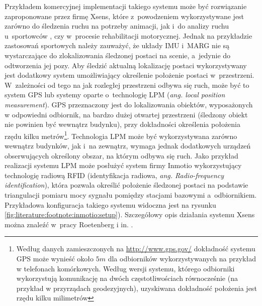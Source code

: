 Przykładem komercyjnej implementacji takiego systemu może być rozwiązanie zaproponowane przez firmę Xsens, które z~powodzeniem wykorzystywane jest zarówno do śledzenia ruchu na potrzeby animacji{}, jak i~do analizy ruchu u~sportowców {}, czy w~procesie rehabilitacji motorycznej{}. Jednak na przykładzie zastosowań sportowych należy zauważyć, że układy IMU i~MARG nie są wystarczające do zlokalizowania śledzonej postaci na scenie, a~jedynie do odtworzenia jej pozy. Aby śledzić aktualną lokalizację postaci wykorzystywany jest dodatkowy system umożliwiający określenie położenie postaci w~przestrzeni. W~zależności od tego na jak rozległej przestrzeni odbywa się ruch, może być to system GPS lub systemy oparte o~technologię LPM (\emph{ang. local position measurement}). GPS przeznaczony jest do lokalizowania obiektów, wyposażonych w odpowiedni odbiornik, na bardzo dużej otwartej przestrzeni (śledzony obiekt nie powinien być wewnątrz budynku), przy dokładności określenia położenia rzędu kilku metrów{\footnote{Według danych zamieszczonych na \url{http://www.gps.gov/} dokładność systemu GPS może wynieść około $5m$ dla odbiorników wykorzystywanych na przykład w telefonach komórkowych. Według wersji systemu, którego  odbiorniki wykorzystują komunikację na dwóch częstotliwościach równocześnie (na przykład w przyrządach geodezyjnych), uzyskiwana dokładność położenia jest rzędu kilku milimetrów}}. Technologia LPM może być wykorzystywana zarówno wewnątrz budynków, jak i~na zewnątrz, wymaga jednak dodatkowych urządzeń obserwujących określony obszar, na którym odbywa się ruch. Jako przykład realizacji systemu LPM może posłużyć system firmy Inmotio wykorzystujący technologię radiową RFID (identyfikacja radiowa, \emph{ang. Radio-frequency identification}), która pozwala określić położenie śledzonej postaci na podstawie triangulacji pomiaru mocy sygnału pomiędzy stacjami bazowymi a~odbiornikiem. Przykładowa konfiguracja takiego systemu widoczna jest na rysunku \ref{fig:literature:footnote:inmotio:setup}). Szczegółowy opis działania systemu Xsens można znaleźć w~pracy Roetenberg i in. \cite{Roetenberg2009}.
					

